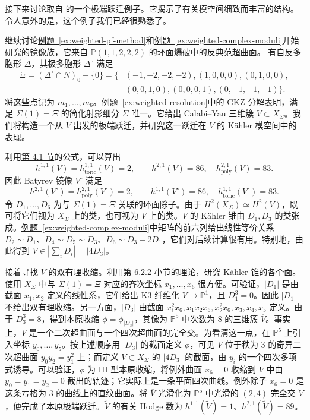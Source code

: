 接下来讨论取自  的一个极端跃迁例子。它揭示了有关模空间细致而丰富的结构。令人意外的是，这个例子我们已经很熟悉了。

\begin{example}\label{ex:weighted-extremal-transition}
继续讨论\hyperref[ex:weighted-pf-method]{例题~\ref*{ex:weighted-pf-method}}和\hyperref[ex:weighted-complex-moduli]{例题~\ref*{ex:weighted-complex-moduli}}开始研究的镜像族，它来自 $\mathbb P(1,1,2,2,2)$ 的环面爆破中的反典范超曲面。
有自反多胞形 $\Delta$，其极多胞形 $\Delta^\circ$ 满足
\[
\begin{aligned}
\Xi=(\Delta^\circ\cap N)_0-\{0\}=\{&(-1,-2,-2,-2),(1,0,0,0),(0,1,0,0),\\
&(0,0,1,0),(0,0,0,1),(0,-1,-1,-1)\}.
\end{aligned}
\]
将这些点记为 $m_1,\ldots,m_6$。\hyperref[ex:weighted-resolution]{例题~\ref*{ex:weighted-resolution}}中的 GKZ 分解表明，满足 $\Sigma(1)=\Xi$ 的简化射影细分 $\Sigma$ 唯一。它给出 Calabi--Yau 三维簇 $V\subset X_\Sigma$。我们将构造一个从 $V$ 出发的极端跃迁，并研究这一跃迁在 $V$ 的 Kähler 模空间中的表现。

利用\hyperref[sec:batyrev-mirror]{第 4.1 节}的公式，可以算出
\[
h^{1,1}(V)=h^{1,1}_{\mathrm{toric}}(V)=2,\qquad
h^{2,1}(V)=86,\quad h^{2,1}_{\mathrm{poly}}(V)=83.
\]
因此 Batyrev 镜像 $V^\circ$ 满足
\[
h^{2,1}(V^\circ)=h^{2,1}_{\mathrm{poly}}(V^\circ)=2,\qquad
h^{1,1}(V^\circ)=86,\quad h^{1,1}_{\mathrm{toric}}(V^\circ)=83.
\]
令 $D_1,\ldots,D_6$ 为与 $\Sigma(1)=\Xi$ 关联的环面除子。由于 $H^2(X_\Sigma)\simeq H^2(V)$，既可将它们视为 $X_\Sigma$ 上的类，也可视为 $V$ 上的类。$V$ 的 Kähler 锥由 $D_1,D_3$ 的类张成。\hyperref[ex:weighted-complex-moduli]{例题~\ref*{ex:weighted-complex-moduli}}中矩阵的前六列给出线性等价关系
$D_2\sim D_1$、$D_4\sim D_5\sim D_3$、$D_6\sim D_3-2D_1$，它们对后续计算很有用。特别地，由此得到 $V\in|\sum_iD_i|=|4D_3|$。

接着寻找 $V$ 的双有理收缩。利用\hyperref[subsec:threefold-kahler-moduli]{第 6.2.2 小节}的理论，研究 Kähler 锥的各个面。使用 $X_\Sigma$ 中与 $\Sigma(1)=\Xi$ 对应的齐次坐标 $x_1,\ldots,x_6$ 很方便。可验证，$|D_1|$ 是由截面 $x_1,x_2$ 定义的线性系，它们给出 K3 纤维化 $V\to\mathbb P^1$，且 $D_1^3=0$。因此 $|D_1|$ 不给出双有理收缩。另一方面，$|D_3|$ 由截面 $x_1^2x_6,x_1x_2x_6,x_2^2x_6,x_3,x_4,x_5$ 定义。由于 $D_3^3=8$，得到本原收缩 $\phi=\phi_{|D_3|}$，其像为 $\mathbb P^5$ 中次数为 8 的三维簇 $\overline V$。事实上，$\overline V$ 是一个二次超曲面与一个四次超曲面的完全交。为看清这一点，在 $\mathbb P^5$ 上引入坐标 $y_0,\ldots,y_5$。按上述顺序用 $|D_3|$ 的截面定义 $\phi$，可见 $\overline V$ 位于秩为 3 的奇异二次超曲面 $y_0y_2=y_1^2$ 上；而定义 $V\subset X_\Sigma$ 的 $|4D_3|$ 的截面，由 $y_i$ 的一个四次多项式诱导。可以验证，$\phi$ 为 III 型本原收缩，将例外曲面 $x_6=0$ 收缩到 $\overline V$ 中由 $y_0=y_1=y_2=0$ 截出的轨迹；它实际上是一条平面四次曲线。例外除子 $x_6=0$ 是这条亏格为 3 的曲线上的直纹曲面。将 $\overline V$ 光滑化为 $\mathbb P^5$ 中光滑的 $(2,4)$ 完全交 $\widetilde V$，便完成了本原极端跃迁。$\widetilde V$ 的有关 Hodge 数为 $h^{1,1}(\widetilde V)=1$、$h^{2,1}(\widetilde V)=89$。


\end{example}
